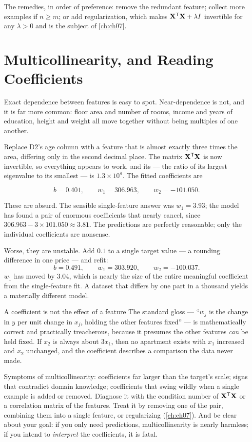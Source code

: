 The remedies, in order of preference: remove the redundant feature; collect more
examples if $n \ge m$; or add regularization, which makes
$\mathbf{X}^{\mathsf{T}}\mathbf{X} + \lambda I$ invertible for any $\lambda>0$ and is the
subject of \cref{ch:ch07}.

\section{Multicollinearity, and Reading Coefficients}
\label{sec:multicollinearity}

Exact dependence between features is easy to spot. Near-dependence is not, and it
is far more common: floor area and number of rooms, income and years of
education, height and weight all move together without being multiples of one
another.

Replace D2's age column with a feature that is almost exactly three times the
area, differing only in the second decimal place. The matrix
$\mathbf{X}^{\mathsf{T}}\mathbf{X}$ is now invertible, so everything appears to work, and
its  --- the ratio of its largest eigenvalue to its
smallest --- is $1.3\times 10^{8}$. The fitted coefficients are

\[
  b = 0.401, \qquad w_1 = 306.963, \qquad w_2 = -101.050 .
\]

These are absurd. The sensible single-feature answer was $w_1 = 3.93$; the model
has found a pair of enormous coefficients that nearly cancel, since
$306.963 - 3\times 101.050 \approx 3.81$. The predictions are perfectly
reasonable; only the individual coefficients are nonsense.

Worse, they are unstable. Add $0.1$ to a single target value --- a rounding
difference in one price --- and refit:
\[
  b = 0.491, \qquad w_1 = 303.920, \qquad w_2 = -100.037 .
\]
$w_1$ has moved by $3.04$, which is nearly the size of the entire meaningful
coefficient from the single-feature fit. A dataset that differs by one part in
a thousand yields a materially different model.

\begin{pitfall}{A coefficient is not the effect of a feature}
The standard gloss --- ``$w_j$ is the change in $y$ per unit change in $x_j$,
holding the other features fixed'' --- is mathematically correct and practically
treacherous, because it presumes the other features \emph{can} be held fixed. If
$x_2$ is always about $3x_1$, then no apartment exists with $x_1$ increased and
$x_2$ unchanged, and the coefficient describes a comparison the data never made.

Symptoms of multicollinearity: coefficients far larger than the target's scale;
signs that contradict domain knowledge; coefficients that swing wildly when a
single example is added or removed. Diagnose it with the condition number of
$\mathbf{X}^{\mathsf{T}}\mathbf{X}$ or a correlation matrix of the features. Treat it by
removing one of the pair, combining them into a single feature, or regularizing
(\cref{ch:ch07}). And be clear about your goal: if you only need predictions,
multicollinearity is nearly harmless; if you intend to \emph{interpret} the
coefficients, it is fatal.
\end{pitfall}

